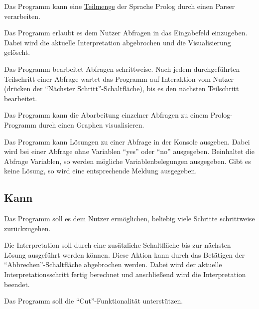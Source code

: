 \documentclass[parskip=full,11pt,twoside]{scrartcl}
\begin{document}
Das Programm kann eine \hyperref[prolog-language]{Teilmenge} der Sprache Prolog durch einen Parser verarbeiten.


Das Programm erlaubt es dem Nutzer Abfragen in das Eingabefeld einzugeben. Dabei wird die aktuelle Interpretation abgebrochen und die Visualisierung gelöscht.


Das Programm bearbeitet Abfragen schrittweise. Nach jedem durchgeführten Teilschritt einer Abfrage wartet das Programm auf Interaktion vom Nutzer (drücken der \enquote{Nächster Schritt}-Schaltfläche), bis es den nächsten Teilschritt bearbeitet.


Das Programm kann die Abarbeitung einzelner Abfragen zu einem Prolog-Programm durch einen Graphen visualisieren.


Das Programm kann Lösungen zu einer Abfrage in der Konsole ausgeben. Dabei wird bei einer Abfrage ohne Variablen \enquote{yes} oder \enquote{no} ausgegeben. Beinhaltet die Abfrage Variablen, so werden mögliche Variablenbelegungen ausgegeben. Gibt es keine Lösung, so wird eine entsprechende Meldung ausgegeben.

\subsection{Kann}


Das Programm soll es dem Nutzer ermöglichen, beliebig viele Schritte schrittweise zurückzugehen.


Die Interpretation soll durch eine zusätzliche Schaltfläche bis zur nächsten Lösung ausgeführt werden können. Diese Aktion kann durch das Betätigen der \enquote{Abbrechen}-Schaltfläche abgebrochen werden. Dabei wird der aktuelle Interpretationsschritt fertig berechnet und anschließend wird die Interpretation beendet.


Das Programm soll die \enquote{Cut}-Funktionalität unterstützen.
\end{document}
